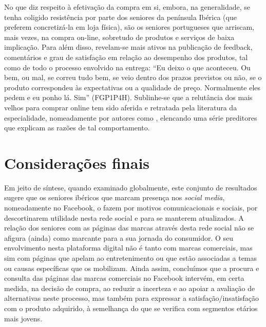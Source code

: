 \documentclass[portuguese]{textolivre}
\begin{document}
No que diz respeito à efetivação da compra em si, embora, na generalidade, se tenha coligido resistência por parte dos seniores da península Ibérica (que preferem concretizá-la em loja física), são os seniores portugueses que arriscam, mais vezes, na compra on-line, sobretudo de produtos e serviços de baixa implicação. Para além disso, revelam-se mais ativos na publicação de feedback, comentários e grau de satisfação em relação ao desempenho dos produtos, tal como de todo o processo envolvido na entrega: “Eu deixo o que aconteceu. Ou bem, ou mal, se correu tudo bem, se veio dentro dos prazos previstos ou não, se o produto correspondeu às expectativas ou a qualidade de preço. Normalmente eles pedem e eu ponho lá. Sim” (FGP1P4H). Sublinhe-se que a relutância dos mais velhos para comprar online tem sido aferida e retratada pela literatura da especialidade, nomeadamente por autores como \textcite{nunan2019}, elencando uma série preditores que explicam as razões de tal comportamento.   

\section{Considerações finais}
Em jeito de síntese, quando examinado globalmente, este conjunto de resultados sugere que os seniores ibéricos que marcam presença nos \emph{social media}, nomeadamente no Facebook, o fazem por motivos comunicacionais e sociais, por descortinarem utilidade nesta rede social e para se manterem atualizados. A relação dos seniores com as páginas das marcas através desta rede social não se afigura (ainda) como marcante para a sua jornada do consumidor. O seu envolvimento nesta plataforma digital não é tanto com marcas comerciais, mas sim com páginas que apelam ao entretenimento ou que estão associadas a temas ou causas específicas que os mobilizam. Ainda assim, concluímos que a procura e consulta das páginas das marcas comerciais no Facebook intervém, em certa medida, na decisão de compra, ao reduzir a incerteza e ao apoiar a avaliação de alternativas neste processo, mas também para expressar a satisfação/insatisfação com o produto adquirido, à semelhança do que se verifica com segmentos etários mais jovens.
\end{document}
